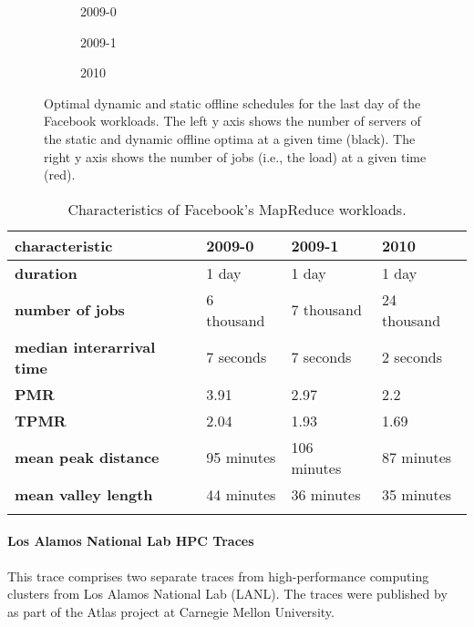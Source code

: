 \begin{figure}
    \begin{subfigure}[b]{.33\linewidth}
    \resizebox{\textwidth}{!}{}
    \caption{2009-0}
    \end{subfigure}
    \begin{subfigure}[b]{.3075\linewidth}
    \resizebox{\textwidth}{!}{}
    \caption{2009-1}
    \end{subfigure}
    \begin{subfigure}[b]{.3475\linewidth}
    \resizebox{\textwidth}{!}{}
    \caption{2010}
    \end{subfigure}
    \caption{Optimal dynamic and static offline schedules for the last day of the Facebook workloads. The left y axis shows the number of servers of the static and dynamic offline optima at a given time (black). The right y axis shows the number of jobs (i.e., the load) at a given time (red).}
    \label{fig:facebook:schedule}
\end{figure}

\begin{table}
    \centering
    \begin{tabularx}{\textwidth}{>{\bfseries}l|X|X|X}
        characteristic & 2009-0 & 2009-1 & 2010 \\\hline
        duration & 1 day & 1 day & 1 day \\
        number of jobs & 6 thousand & 7 thousand & 24 thousand \\
        median interarrival time & 7 seconds & 7 seconds & 2 seconds \\
        PMR & 3.91 & 2.97 & 2.2 \\
        TPMR & 2.04 & 1.93 & 1.69 \\
        mean peak distance & 95 minutes & 106 minutes & 87 minutes \\
        mean valley length & 44 minutes & 36 minutes & 35 minutes \\
    \caption{Characteristics of Facebook's MapReduce workloads.}
    \end{tabularx}
    \label{tab:facebook}
\end{table}

\paragraph{Los Alamos National Lab HPC Traces~\cite{Amvrosiadis2018_3, Amvrosiadis2018, Amvrosiadis2018_2}} This trace comprises two separate traces from high-performance computing clusters from Los Alamos National Lab (LANL). The traces were published by \citeauthor{Amvrosiadis2018}~\cite{Amvrosiadis2018} as part of the Atlas project at Carnegie Mellon University.

